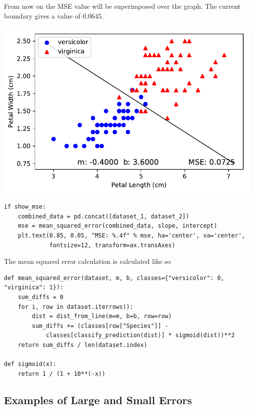 \documentclass[letterpaper]{article}
\begin{document}
From now on the MSE value will be superimposed over the graph. The current
boundary gives a value of $0.0645$.
\begin{center}
\includegraphics{plot_2a.pdf}
\end{center}
\begin{verbatim}
if show_mse:
    combined_data = pd.concat([dataset_1, dataset_2])
    mse = mean_squared_error(combined_data, slope, intercept)
    plt.text(0.85, 0.05, "MSE: %.4f" % mse, ha='center', va='center',
             fontsize=12, transform=ax.transAxes)
\end{verbatim}
The mean squared error calculation is calculated like so
\begin{verbatim}
def mean_squared_error(dataset, m, b, classes={"versicolor": 0, "virginica": 1}):
    sum_diffs = 0
    for i, row in dataset.iterrows():
        dist = dist_from_line(m=m, b=b, row=row)
        sum_diffs += (classes[row["Species"]] -
            classes[classify_prediction(dist)] * sigmoid(dist))**2
    return sum_diffs / len(dataset.index)

def sigmoid(x):
    return 1 / (1 + 10**(-x))
\end{verbatim}
 
\subsection{Examples of Large and Small Errors}
\end{document}
